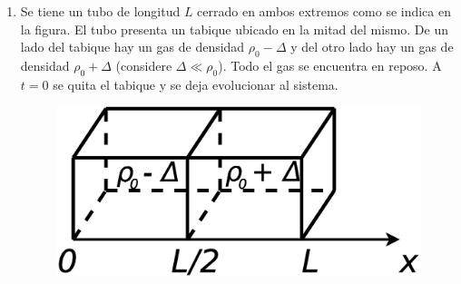 \documentclass[11pt,spanish,a4paper]{article}
\begin{document}
\begin{enumerate}
\item Se tiene un tubo de longitud $L$ cerrado en ambos extremos como se
indica en la figura. El tubo presenta un tabique ubicado en la mitad
del mismo. De un lado del tabique hay un gas de densidad $\rho_{0}-\Delta$
y del otro lado hay un gas de densidad $\rho_{0}+\Delta$ (considere
$\Delta\ll\rho_{0}$). Todo el gas se encuentra en reposo. A $t=0$
se quita el tabique y se deja evolucionar al sistema.
\begin{figure}[H]
\centering{}\includegraphics[clip,scale=0.25]{ej1-30}
\end{figure}



\end{enumerate}
\end{document}
